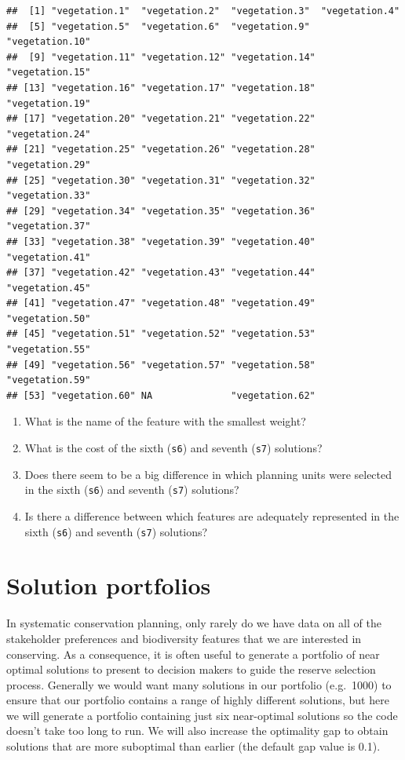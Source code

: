 \documentclass[12pt,]{book}
\providecommand{\tightlist}{%
  \setlength{\itemsep}{0pt}\setlength{\parskip}{0pt}}
\let\BeginKnitrBlock\begin \let\EndKnitrBlock\end
\begin{document}
\begin{verbatim}
##  [1] "vegetation.1"  "vegetation.2"  "vegetation.3"  "vegetation.4" 
##  [5] "vegetation.5"  "vegetation.6"  "vegetation.9"  "vegetation.10"
##  [9] "vegetation.11" "vegetation.12" "vegetation.14" "vegetation.15"
## [13] "vegetation.16" "vegetation.17" "vegetation.18" "vegetation.19"
## [17] "vegetation.20" "vegetation.21" "vegetation.22" "vegetation.24"
## [21] "vegetation.25" "vegetation.26" "vegetation.28" "vegetation.29"
## [25] "vegetation.30" "vegetation.31" "vegetation.32" "vegetation.33"
## [29] "vegetation.34" "vegetation.35" "vegetation.36" "vegetation.37"
## [33] "vegetation.38" "vegetation.39" "vegetation.40" "vegetation.41"
## [37] "vegetation.42" "vegetation.43" "vegetation.44" "vegetation.45"
## [41] "vegetation.47" "vegetation.48" "vegetation.49" "vegetation.50"
## [45] "vegetation.51" "vegetation.52" "vegetation.53" "vegetation.55"
## [49] "vegetation.56" "vegetation.57" "vegetation.58" "vegetation.59"
## [53] "vegetation.60" NA              "vegetation.62"
\end{verbatim}

\BeginKnitrBlock{rmdquestion}
\begin{enumerate}
\def\labelenumi{\arabic{enumi}.}
\tightlist
\item
  What is the name of the feature with the smallest weight?
\item
  What is the cost of the sixth (\texttt{s6}) and seventh (\texttt{s7})
  solutions?
\item
  Does there seem to be a big difference in which planning units were
  selected in the sixth (\texttt{s6}) and seventh (\texttt{s7})
  solutions?
\item
  Is there a difference between which features are adequately
  represented in the sixth (\texttt{s6}) and seventh (\texttt{s7})
  solutions?
\end{enumerate}
\EndKnitrBlock{rmdquestion}

\section{Solution portfolios}\label{solution-portfolios}

In systematic conservation planning, only rarely do we have data on all
of the stakeholder preferences and biodiversity features that we are
interested in conserving. As a consequence, it is often useful to
generate a portfolio of near optimal solutions to present to decision
makers to guide the reserve selection process. Generally we would want
many solutions in our portfolio (e.g.~1000) to ensure that our portfolio
contains a range of highly different solutions, but here we will
generate a portfolio containing just six near-optimal solutions so the
code doesn't take too long to run. We will also increase the optimality
gap to obtain solutions that are more suboptimal than earlier (the
default gap value is 0.1).
\end{document}
